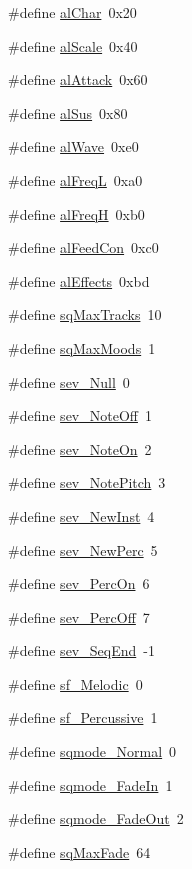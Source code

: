 \begin{DoxyCompactItemize}
\#define \hyperlink{ID__SD_8H_a99ada014bfd6f2caf85af987419a951b}{alChar}~0x20
\item 
\#define \hyperlink{ID__SD_8H_ade01e21626b1cca6d676273b748466f9}{alScale}~0x40
\item 
\#define \hyperlink{ID__SD_8H_ab81fb8377c8d8128293a787e91564aeb}{alAttack}~0x60
\item 
\#define \hyperlink{ID__SD_8H_a13371290f5b76248bd25ca900a12f9bd}{alSus}~0x80
\item 
\#define \hyperlink{ID__SD_8H_a2111312516418f373d67458cc8855354}{alWave}~0xe0
\item 
\#define \hyperlink{ID__SD_8H_a53fec1af507ab356bf7d7578de8e5f83}{alFreqL}~0xa0
\item 
\#define \hyperlink{ID__SD_8H_a51fbfe1e4f3246d3768bccc2ee26bc3a}{alFreqH}~0xb0
\item 
\#define \hyperlink{ID__SD_8H_a290bd6fdb19cb2f8711748538180c428}{alFeedCon}~0xc0
\item 
\#define \hyperlink{ID__SD_8H_a13de5bd9ef6dccbf77fc3a97519374be}{alEffects}~0xbd
\item 
\#define \hyperlink{ID__SD_8H_a5236b155d598ae9bb472c2947cf3f403}{sqMaxTracks}~10
\item 
\#define \hyperlink{ID__SD_8H_aa2b750779049f38b74f94c9c3c9d3b99}{sqMaxMoods}~1
\item 
\#define \hyperlink{ID__SD_8H_a83bbcf1d2954eed7097dca9f74d6ed92}{sev\_\-Null}~0
\item 
\#define \hyperlink{ID__SD_8H_ad6a1d24927828001013a01b19d60ace0}{sev\_\-NoteOff}~1
\item 
\#define \hyperlink{ID__SD_8H_aae792915e01b313065d31df511208ab8}{sev\_\-NoteOn}~2
\item 
\#define \hyperlink{ID__SD_8H_a8fdbaf90044b606cef578564ad5ca81e}{sev\_\-NotePitch}~3
\item 
\#define \hyperlink{ID__SD_8H_a962799f1a5ec645bd76f8e5999669053}{sev\_\-NewInst}~4
\item 
\#define \hyperlink{ID__SD_8H_a899bed0051d90722e7023795fbb10bb5}{sev\_\-NewPerc}~5
\item 
\#define \hyperlink{ID__SD_8H_a84edc703b889c817ddd556df857e6c12}{sev\_\-PercOn}~6
\item 
\#define \hyperlink{ID__SD_8H_ae16508552136555cdb3eebb7016f154d}{sev\_\-PercOff}~7
\item 
\#define \hyperlink{ID__SD_8H_aa1352fb5ee10b2798e1362019192efe8}{sev\_\-SeqEnd}~-\/1
\item 
\#define \hyperlink{ID__SD_8H_a3bcfcc1a69109bddd3b1fc2f52c6ad81}{sf\_\-Melodic}~0
\item 
\#define \hyperlink{ID__SD_8H_a3feb22aa7afa51c3645bcf0c3171b82a}{sf\_\-Percussive}~1
\item 
\#define \hyperlink{ID__SD_8H_a864be0801686806048bbf6bb4607b9b9}{sqmode\_\-Normal}~0
\item 
\#define \hyperlink{ID__SD_8H_aacd3e1fd085a55d878eb8360a626d546}{sqmode\_\-FadeIn}~1
\item 
\#define \hyperlink{ID__SD_8H_aa4ee0dcefb0265a576b2af0d9f4f1a76}{sqmode\_\-FadeOut}~2
\item 
\#define \hyperlink{ID__SD_8H_a4245f44a4345ad1b58568d699a3dbf71}{sqMaxFade}~64
\end{DoxyCompactItemize}
